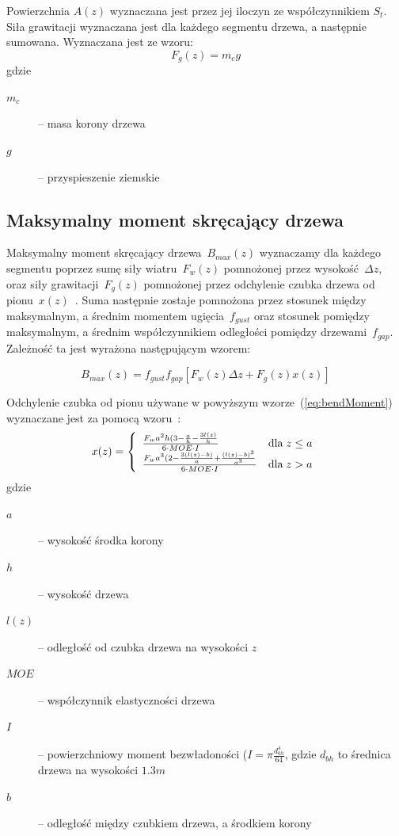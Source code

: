 Powierzchnia $A(z)$ wyznaczana jest przez jej iloczyn ze współczynnikiem $S_t$.
\\

Siła grawitacji wyznaczana jest dla każdego segmentu drzewa, a następnie sumowana. Wyznaczana jest ze wzoru:
\begin{equation}
\label{eq:gravityForce}
	F_g(z) = m_c g
\end{equation}
gdzie
\begin{description}
	\item[$m_c$] -- masa korony drzewa
	\item[$g$] -- przyspieszenie ziemskie
\end{description}


\subsection{Maksymalny moment skręcający drzewa}

Maksymalny moment skręcający drzewa~$B_{max}(z)$ wyznaczamy dla każdego segmentu poprzez sumę siły wiatru~$F_w(z)$ pomnożonej przez wysokość~$\Delta z$, oraz siły grawitacji~$F_g(z)$ pomnożonej przez odchylenie czubka drzewa od pionu~$x(z)$~\cite{chm_ang}. Suma następnie zostaje pomnożona przez stosunek między maksymalnym, a średnim momentem ugięcia~$f_{gust}$ oraz stosunek pomiędzy maksymalnym, a średnim współczynnikiem odległości pomiędzy drzewami~$f_{gap}$. Zależność ta jest wyrażona następującym wzorem:

\begin{equation}
\label{eq:bendMoment}
	B_{max}(z) = f_{gust} f_{gap} [ F_w(z) \Delta z + F_g(z) x(z)]
\end{equation}

Odchylenie czubka od pionu używane w powyższym wzorze~(\ref{eq:bendMoment}) wyznaczane jest za pomocą wzoru~\cite{chm_ang}:
\begin{equation}
	\label{eq:crovnDeviation}
	 x(z) =
	\left\{
	\begin{array}{l r}
  		\frac{F_w a^2h(3- \frac{a}{h} - \frac{3l(z)}{h} }{6 \cdot MOE \cdot I} 	& \text{dla} \; z \leq a\\
	    	\frac{F_w a^3 (2-\frac{3(l(z)-b)}{a} + \frac{(l(z) - b)^3}{a^3}}{6 \cdot MOE \cdot I} & \text{dla} \; z > a\\
	  \end{array} \right.
\end{equation}
gdzie
\begin{description}
	\item[$a$] -- wysokość środka korony
	\item[$h$] -- wysokość drzewa
	\item[$l(z)$] -- odległość od czubka drzewa na wysokości $z$
	\item[$MOE$] -- współczynnik elastyczności drzewa
	\item[$I$] -- powierzchniowy moment bezwładoności ($I = \pi \frac{d_{bh}^4}{64}$, gdzie $d_{bh}$ to średnica drzewa na wysokości $1.3m$
	\item[$b$] -- odległość między czubkiem drzewa, a środkiem korony
\end{description}

